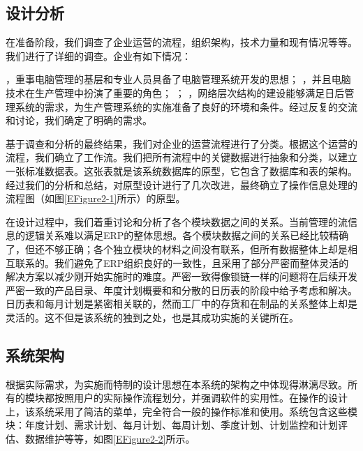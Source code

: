 \subsection{设计分析}

在准备阶段，我们调查了企业运营的流程，组织架构，技术力量和现有情况等等。我们进行了详细的调查。企业有如下情况：
\begin{itemize}
，重事电脑管理的基层和专业人员具备了电脑管理系统开发的思想；
，并且电脑技术在生产管理中扮演了重要的角色；
；
，网络层次结构的建设能够满足日后管理系统的需求，为生产管理系统的实施准备了良好的环境和条件。经过反复的交流和讨论，我们确定了明确的需求。
\end{itemize}

基于调查和分析的最终结果，我们对企业的运营流程进行了分类。根据这个运营的流程，我们确立了工作流。我们把所有流程中的关键数据进行抽象和分类，以建立一张标准数据表。这张表就是该系统数据库的原型，它包含了数据库和表的架构。经过我们的分析和总结，对原型设计进行了几次改进，最终确立了操作信息处理的流程图（如图\ref{EFigure2-1}所示）的原型。

        
在设计过程中，我们着重讨论和分析了各个模块数据之间的关系。当前管理的流信息的逻辑关系难以满足ERP的整体思想。各个模块数据之间的关系已经比较精确了，但还不够正确；各个独立模块的材料之间没有联系，但所有数据整体上却是相互联系的。我们避免了ERP组织良好的一致性，且采用了部分严密而整体灵活的解决方案以减少刚开始实施时的难度。严密一致得像锁链一样的问题将在后续开发严密一致的产品目录、年度计划概要和和分散的日历表的阶段中给予考虑和解决。日历表和每月计划是紧密相关联的，然而工厂中的存货和在制品的关系整体上却是灵活的。这不但是该系统的独到之处，也是其成功实施的关键所在。

\subsection{系统架构}

根据实际需求，为实施而特制的设计思想在本系统的架构之中体现得淋漓尽致。所有的模块都按照用户的实际操作流程划分，并强调软件的实用性。在操作的设计上，该系统采用了简洁的菜单，完全符合一般的操作标准和使用。系统包含这些模块：年度计划、需求计划、每月计划、每周计划、季度计划、计划监控和计划评估、数据维护等等，如图\ref{EFigure2-2}所示。


